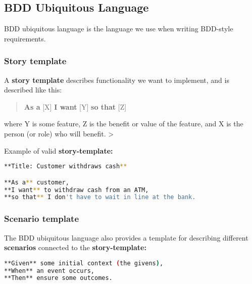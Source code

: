 \pagebreak



\hypertarget{bdd-ubiquitous-language}{%
\subsection{BDD Ubiquitous Language}\label{bdd-ubiquitous-language}}

BDD ubiquitous language is the language we use when writing BDD-style
requirements.

\hypertarget{story-template}{%
\subsubsection{Story template}\label{story-template}}

A \textbf{story template} describes functionality we want to implement,
and is described like this:

\begin{quote}
\textbf{As a} {[}X{]} \textbf{I want} {[}Y{]} \textbf{so that} {[}Z{]}
\end{quote}

where Y is some feature, Z is the benefit or value of the feature, and X
is the person (or role) who will benefit. \textgreater{}

Example of valid \textbf{story-template:}

\begin{lstlisting}[language=bash]
**Title: Customer withdraws cash**

**As a** customer,
**I want** to withdraw cash from an ATM,
**so that** I don't have to wait in line at the bank.
\end{lstlisting}

\hypertarget{scenario-template}{%
\subsubsection{Scenario template}\label{scenario-template}}

The BDD ubiquitous language also provides a template for describing
different \textbf{scenarios} connected to the \textbf{story-template:}

\begin{lstlisting}[language=bash]
**Given** some initial context (the givens),  
**When** an event occurs,  
**Then** ensure some outcomes.
\end{lstlisting}

